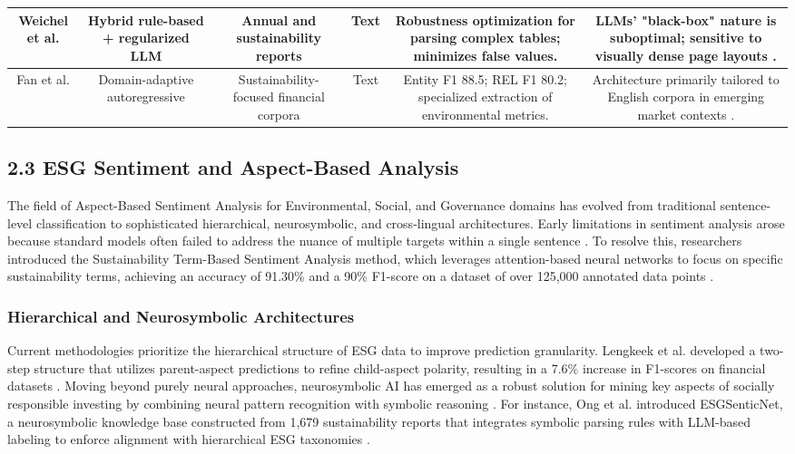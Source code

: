 \documentclass{article}
\begin{document}
\begin{table}[h!]
\begin{tabular}{|c|c|c|c|c|c|}
Weichel et al.  \parencite{hendrik_weichel_5ea70935} & Hybrid rule-based + regularized LLM & Annual and sustainability reports & Text & Robustness optimization for parsing complex tables; minimizes false values. & LLMs' "black-box" nature is suboptimal; sensitive to visually dense page layouts  \parencite{hendrik_weichel_5ea70935}. \\ \hline
Fan et al.  \parencite{j__h__fan_97bd591d} & Domain-adaptive autoregressive & Sustainability-focused financial corpora & Text & Entity F1 88.5; REL F1 80.2; specialized extraction of environmental metrics. & Architecture primarily tailored to English corpora in emerging market contexts  \parencite{j__h__fan_97bd591d}. \\ \hline
\end{tabular}
\end{table}
\subsection{2.3 ESG Sentiment and Aspect-Based Analysis}

The field of Aspect-Based Sentiment Analysis for Environmental, Social, and Governance domains has evolved from traditional sentence-level classification to sophisticated hierarchical, neurosymbolic, and cross-lingual architectures. Early limitations in sentiment analysis arose because standard models often failed to address the nuance of multiple targets within a single sentence  \parencite{blaise_sandwidi_c58b16e0}. To resolve this, researchers introduced the Sustainability Term-Based Sentiment Analysis method, which leverages attention-based neural networks to focus on specific sustainability terms, achieving an accuracy of 91.30\% and a 90\% F1-score on a dataset of over 125,000 annotated data points  \parencite{blaise_sandwidi_c58b16e0}.
\subsubsection{Hierarchical and Neurosymbolic Architectures}

Current methodologies prioritize the hierarchical structure of ESG data to improve prediction granularity. Lengkeek et al.  \parencite{matteo_lengkeek_5d9f2a4e} developed a two-step structure that utilizes parent-aspect predictions to refine child-aspect polarity, resulting in a 7.6\% increase in F1-scores on financial datasets  \parencite{matteo_lengkeek_5d9f2a4e}. Moving beyond purely neural approaches, neurosymbolic AI has emerged as a robust solution for mining key aspects of socially responsible investing by combining neural pattern recognition with symbolic reasoning  \parencite{wihan_van_der_heever_5ff35709}. For instance, Ong et al.  \parencite{keane_ong_8fec4760} introduced ESGSenticNet, a neurosymbolic knowledge base constructed from 1,679 sustainability reports that integrates symbolic parsing rules with LLM-based labeling to enforce alignment with hierarchical ESG taxonomies  \parencite{keane_ong_8fec4760}.
\end{document}
